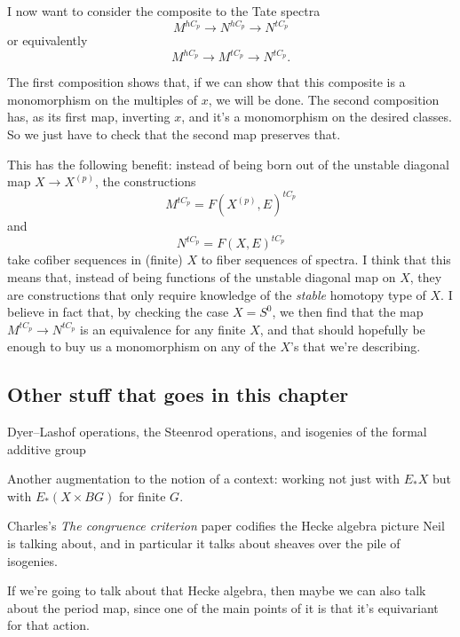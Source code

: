 I now want to consider the composite to the Tate spectra \[M^{hC_p} \to N^{hC_p} \to N^{tC_p}\] or equivalently \[M^{hC_p} \to M^{tC_p} \to N^{tC_p}.\]

The first composition shows that, if we can show that this composite is a monomorphism on the multiples of $x$, we will be done. The second composition has, as its first map, inverting $x$, and it's a monomorphism on the desired classes. So we just have to check that the second map preserves that.

This has the following benefit: instead of being born out of the unstable diagonal map $X \to X^{(p)}$, the constructions
\[M^{tC_p} = F(X^{(p)}, E)^{tC_p}\]
and
\[N^{tC_p} = F(X,E)^{tC_p}\]
take cofiber sequences in (finite) $X$ to fiber sequences of spectra. I think that this means that, instead of being functions of the unstable diagonal map on $X$, they are constructions that only require knowledge of the \emph{stable} homotopy type of $X$. I believe in fact that, by checking the case $X = S^0$, we then find that the map $M^{tC_p} \to N^{tC_p}$ is an equivalence for any finite $X$, and that should hopefully be enough to buy us a monomorphism on any of the $X$'s that we're describing.









\subsection*{Other stuff that goes in this chapter}

Dyer--Lashof operations, the Steenrod operations, and isogenies of the formal additive group 

Another augmentation to the notion of a context: working not just with $E_* X$ but with $E_*(X \times BG)$ for finite $G$.

Charles's \textit{The congruence criterion} paper codifies the Hecke algebra picture Neil is talking about, and in particular it talks about sheaves over the pile of isogenies.

If we're going to talk about that Hecke algebra, then maybe we can also talk about the period map, since one of the main points of it is that it's equivariant for that action.

